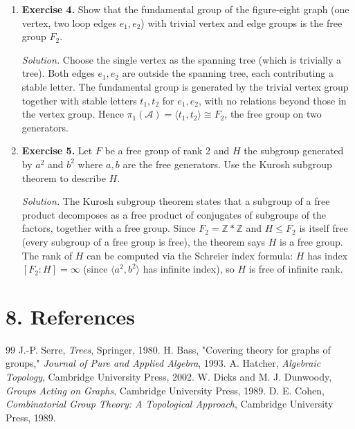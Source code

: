 \begin{enumerate}[leftmargin=*,itemsep=0.9em]
\item \textbf{Exercise 4.} Show that the fundamental group of the figure-eight graph (one vertex, two loop edges $e_1,e_2$) with trivial vertex and edge groups is the free group $F_2$.

\emph{Solution.} Choose the single vertex as the spanning tree (which is trivially a tree). Both edges $e_1,e_2$ are outside the spanning tree, each contributing a stable letter. The fundamental group is generated by the trivial vertex group together with stable letters $t_1,t_2$ for $e_1,e_2$, with no relations beyond those in the vertex group. Hence $\pi_1(\mathcal{A})=\langle t_1,t_2\rangle\cong F_2$, the free group on two generators.

\item \textbf{Exercise 5.} Let $F$ be a free group of rank 2 and $H$ the subgroup generated by $a^2$ and $b^2$ where $a,b$ are the free generators. Use the Kurosh subgroup theorem to describe $H$.

\emph{Solution.} The Kurosh subgroup theorem states that a subgroup of a free product decomposes as a free product of conjugates of subgroups of the factors, together with a free group. Since $F_2=\mathbb{Z}*\mathbb{Z}$ and $H\le F_2$ is itself free (every subgroup of a free group is free), the theorem says $H$ is a free group. The rank of $H$ can be computed via the Schreier index formula: $H$ has index $[F_2:H]=\infty$ (since $\langle a^2,b^2\rangle$ has infinite index), so $H$ is free of infinite rank.

\end{enumerate}
\section*{8. References}
\begin{thebibliography}{99}
 J.-P. Serre, \emph{Trees}, Springer, 1980.
 H. Bass, "Covering theory for graphs of groups," \emph{Journal of Pure and Applied Algebra}, 1993.
 A. Hatcher, \emph{Algebraic Topology}, Cambridge University Press, 2002.
 W. Dicks and M. J. Dunwoody, \emph{Groups Acting on Graphs}, Cambridge University Press, 1989.
 D. E. Cohen, \emph{Combinatorial Group Theory: A Topological Approach}, Cambridge University Press, 1989.
\end{thebibliography}
